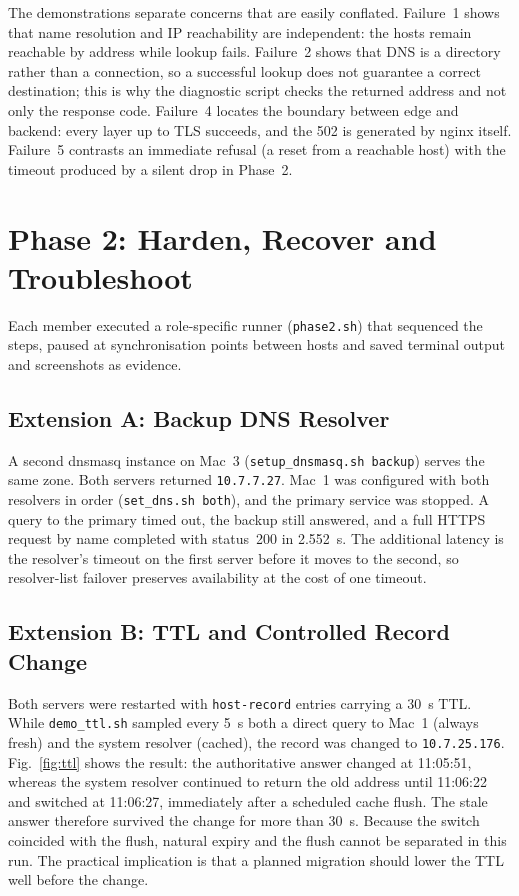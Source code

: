 \documentclass[conference,a4paper]{IEEEtran}
\newcommand{\code}[1]{\texttt{#1}}
\begin{document}
The demonstrations separate concerns that are easily conflated. Failure~1 shows that name
resolution and IP reachability are independent: the hosts remain reachable by address while
lookup fails. Failure~2 shows that DNS is a directory rather than a connection, so a successful
lookup does not guarantee a correct destination; this is why the diagnostic script checks the
returned address and not only the response code. Failure~4 locates the boundary between edge and
backend: every layer up to TLS succeeds, and the 502 is generated by nginx itself. Failure~5
contrasts an immediate refusal (a reset from a reachable host) with the timeout produced by a
silent drop in Phase~2.

\section{Phase 2: Harden, Recover and Troubleshoot}
\label{sec:p2}

Each member executed a role-specific runner (\code{phase2.sh}) that sequenced the steps, paused
at synchronisation points between hosts and saved terminal output and screenshots as evidence.

\subsection{Extension A: Backup DNS Resolver}
A second dnsmasq instance on Mac~3 (\code{setup\_dnsmasq.sh backup}) serves the same zone. Both
servers returned \code{10.7.7.27}. Mac~1 was configured with both resolvers in order
(\code{set\_dns.sh both}), and the primary service was stopped. A query to the primary timed
out, the backup still answered, and a full HTTPS request by name completed with status~200 in
2.552~s. The additional latency is the resolver's timeout on the first server before it moves to
the second, so resolver-list failover preserves availability at the cost of one timeout.

\subsection{Extension B: TTL and Controlled Record Change}
Both servers were restarted with \code{host-record} entries carrying a 30~s TTL. While
\code{demo\_ttl.sh} sampled every 5~s both a direct query to Mac~1 (always fresh) and the system
resolver (cached), the record was changed to \code{10.7.25.176}. Fig.~\ref{fig:ttl} shows the
result: the authoritative answer changed at 11:05:51, whereas the system resolver continued to
return the old address until 11:06:22 and switched at 11:06:27, immediately after a scheduled
cache flush. The stale answer therefore survived the change for more than 30~s. Because the
switch coincided with the flush, natural expiry and the flush cannot be separated in this run.
The practical implication is that a planned migration should lower the TTL well before the
change.
\end{document}
